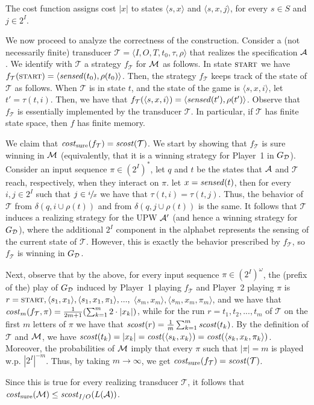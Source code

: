 \documentclass[runningheads,a4paper]{llncs}
\newcommand{\zug}[1]{\langle #1  \rangle}
\newcommand{\T}{{\mathcal T}}
\newcommand{\A}{{\cal A}}
\newcommand{\D}{{\cal D}}
\newcommand{\M}{{\cal M}}
\newcommand{\sen}{{\it sensed}}
\newcommand{\scost}{{\it scost}}
\newcommand{\cost}{{\it cost}}
\newcommand{\tIN}{{2^I}}
\newcommand{\tINs}{{{(2^I)}^*}}
\newcommand{\tINo}{{{(2^I)}^\omega}}
\newcommand{\MDPcost}{{\it cost}}
\newcommand{\start}{{\textsc{start}}}
\newcommand{\costs}{{\it cost}_{\rm sure}}
\begin{document}
{The cost function assigns cost $|x|$ to states $\zug{s,x}$ and $\zug{s,x,j}$, for every $s\in S$ and $j\in \tIN$.

We now proceed to analyze the correctness of the construction. Consider a (not necessarily finite) transducer $\T=\zug{I,O,T,t_0,\tau,\rho}$ that realizes the specification $\A$. We identify with $\T$ a strategy $f_\T$ for $\M$ as follows. 
In state $\start$ we have $f_\T(\start)=\zug{\sen(t_0),\rho(t_0)}$. Then, the strategy $f_\T$ keeps track of the state of $\T$ as follows. When $\T$ is in state $t$, and the state of the game is $\zug{s,x,i}$, let $t'=\tau(t,i)$. Then, we have that $f_\T(\zug{s,x,i})=\zug{\sen(t'),\rho(t')}$. Observe that $f_\T$ is essentially implemented by the transducer $\T$. In particular, if $\T$ has finite state space, then $f$ has finite memory.

We claim that $\costs(f_\T)=\scost(\T)$. We start by showing that $f_\T$ is sure winning in $\M$ (equivalently, that it is a winning strategy for Player~1 in $G_\D$). Consider an input sequence $\pi\in \tINs$, let $q$ and $t$ be the states that $\A$ and $\T$ reach, respectively, when they interact on $\pi$. let $x=\sen(t)$, then for every $i,j\in \tIN$ such that $j\in \sfrac{i}{x}$ we have that $\tau(t,i)=\tau(t,j)$. Thus, the behavior of $\T$ from $\delta(q,i\cup \rho(t))$ and from $\delta(q,j\cup \rho(t))$ is the same. It follows that $\T$ induces a realizing strategy for the UPW $\A'$ (and hence a winning strategy for $G_\D$), where the additional $\tIN$ component in the alphabet represents the sensing of the current state of $\T$. However, this is exactly the behavior prescribed by $f_\T$, so $f_\T$ is winning in $G_\D$. 

Next, observe that by the above, for every input sequence $\pi\in \tINo$, the (prefix of the) play of $G_\D$ induced by Player~1 playing $f_\T$ and Player~2 playing $\pi$ is $r=\start,\zug{s_1,x_1},\zug{s_1,x_1,\pi_1},...,$ $\zug{s_m,x_m},\zug{s_m,x_m,\pi_m}$, and we have that $\cost_m(f_\T,\pi)=\frac{1}{2m+1}(\sum_{k=1}^m 2\cdot|x_k|)$, while for the run $r=t_1,t_2,...,t_m$ of $\T$ on the first $m$ letters of $\pi$ we have that $\scost(r)=\frac{1}{m}\sum_{k=1}^m \scost(t_k)$. By the definition of $\T$ and $\M$, we have $\scost(t_k)=|x_k|=\MDPcost(\zug{s_k,x_k})=\MDPcost(\zug{s_k,x_k,\pi_k})$. Moreover, the probabilities of $\M$ imply that every $\pi$ such that $|\pi|=m$ is played w.p. $|\tIN|^{-m}$. Thus, by taking $m\to \infty$, we get $\costs(f_\T)=\scost(\T)$. 

Since this is true for every realizing transducer $\T$, it follows that $\costs(\M)\le\scost_{I/O}(L(\A))$.

}
\end{document}
